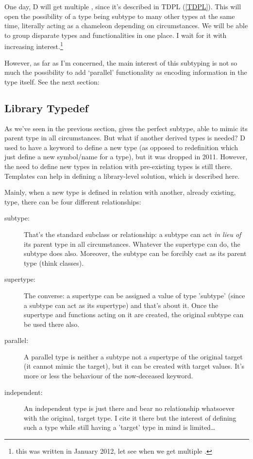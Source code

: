 One day, D will get multiple , since it's described in TDPL (\ref{TDPL}). This will open the possibility of a type being subtype to many other types at the same time, literally acting as a chameleon depending on circumstances. We will be able to group disparate types and functionalities in one place. I wait for it with increasing interest.\footnote{this was written in January 2012, let see when we get multiple .}

However, as far as I'm concerned, the main interest of this subtyping is not so much the possibility to add `parallel' functionality as encoding information in the type itself. See the next section:

\subsection{Library Typedef}\label{typedef}

As we've seen in the previous section,  gives the perfect subtype, able to mimic its parent type in all circumstances. But what if another derived types is needed? D used to have a  keyword to define a new type (as opposed to  redefinition which just define a new symbol/name for a type), but it was dropped in 2011. However, the need to define new types in relation with pre-existing types is still there. Templates can help in defining a library-level solution, which is described here.

Mainly, when a new type is defined in relation with another, already existing, type, there can be four different relationships:

\begin{description}
\item[subtype:] That's the standard subclass or  relationship: a subtype can act \emph{in lieu of} its parent type in all circumstances. Whatever the supertype can do, the subtype does also. Moreover, the subtype can be forcibly cast as its parent type (think classes).
\item[supertype:] The converse: a supertype can be assigned a value of type 'subtype' (since a subtype can act as its supertype) and that's about it. Once the supertype and functions acting on it are created, the original subtype can be used there also.
\item[parallel:] A parallel type is neither a subtype not a supertype of the original target (it cannot mimic the target), but it can be created with target values. It's more or less the behaviour of the now-deceased  keyword.
\item[independent:] An independent type is just there and bear no relationship whatsoever with the original, target type. I cite it there but the interest of defining such a type while still having a 'target' type in mind is limited\ldots
\end{description}

